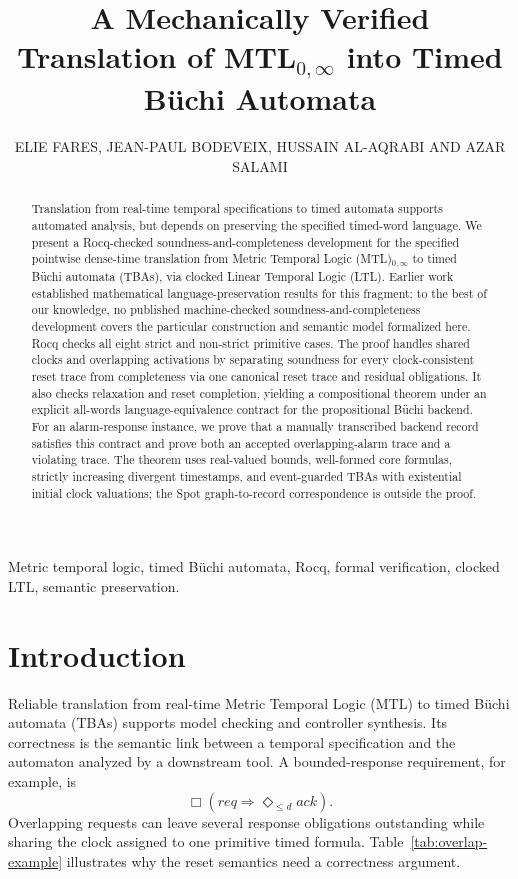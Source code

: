\documentclass{ieeeaccess}
\title{A Mechanically Verified Translation of MTL$_{0,\infty}$ into Timed B\"uchi Automata}
\author{\uppercase{Elie Fares}\authorrefmark{1},
\uppercase{Jean-Paul Bodeveix}\authorrefmark{2},
\uppercase{Hussain Al-Aqrabi}\authorrefmark{1} AND
\uppercase{Azar Salami}\authorrefmark{1}}
\begin{document}
\history{}
\doi{}

\begin{abstract}
Translation from real-time temporal specifications to timed automata supports
automated analysis, but depends on preserving the specified timed-word
language. We present a Rocq-checked soundness-and-completeness development for
the specified pointwise dense-time translation from Metric Temporal Logic
(MTL)$_{0,\infty}$ to timed B\"uchi automata (TBAs), via clocked Linear
Temporal Logic (LTL). Earlier work established mathematical language-preservation
results for this fragment; to the best of our knowledge, no published
machine-checked soundness-and-completeness development covers the particular
construction and semantic model formalized here. Rocq checks all eight strict
and non-strict primitive cases. The proof handles shared clocks and overlapping
activations by separating soundness for every clock-consistent reset trace
from completeness via one canonical reset trace and residual obligations. It
also checks relaxation and reset completion, yielding a compositional theorem
under an explicit all-words language-equivalence contract for the propositional
B\"uchi backend. For an alarm-response instance, we prove that a manually
transcribed backend record satisfies this contract and prove both an accepted
overlapping-alarm trace and a violating trace. The theorem uses real-valued
bounds, well-formed core formulas, strictly increasing divergent timestamps,
and event-guarded TBAs with existential initial clock valuations; the Spot
graph-to-record correspondence is outside the proof.
\end{abstract}

\begin{keywords}
Metric temporal logic, timed B\"uchi automata, Rocq, formal verification,
clocked LTL, semantic preservation.
\end{keywords}
\maketitle

\section{Introduction}
\label{sec:introduction}
Reliable translation from real-time Metric Temporal Logic (MTL) to timed
B\"uchi automata (TBAs) supports model checking and controller synthesis. Its
correctness is the semantic link between a temporal specification and the
automaton analyzed by a downstream tool. A bounded-response requirement, for example, is
\begin{equation*}
\Box(\mathit{req}\Rightarrow\Diamond_{\le d}\mathit{ack}).
\end{equation*}
Overlapping requests can leave several response obligations outstanding while
sharing the clock assigned to one primitive timed formula. Table~\ref{tab:overlap-example}
illustrates why the reset semantics need a correctness argument.
\end{document}
